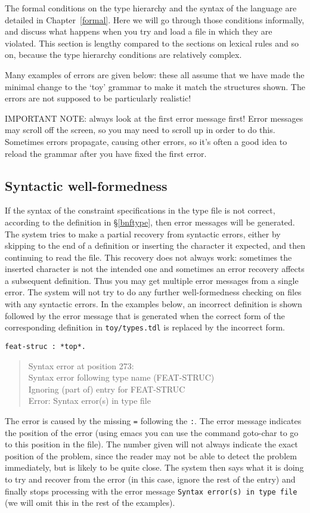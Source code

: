 \documentclass[12pt]{report}
\newenvironment{error}%
{\begin{quote}
\tt
}%
{\end{quote}
}
\begin{document}
The formal conditions on the type hierarchy and the syntax of the
language are
detailed in Chapter~\ref{formal}.
Here we will go through those conditions informally, and discuss what
happens when you try and load a file in which they are violated.
This section is lengthy compared to the sections
on lexical rules and so on, because the type hierarchy conditions
are relatively complex.

Many examples of errors 
are given below: these all assume that we have made the minimal
change to the `toy' grammar to make it match the structures shown.
The errors are not supposed to be particularly realistic!

IMPORTANT NOTE:  always look at the first error message first!
Error messages may scroll off the screen, so you may need to scroll up
in order to do this.  Sometimes errors propagate,
causing other errors, so it's often a good idea to reload the grammar
after you have fixed the first error.

\subsection{Syntactic well-formedness}
\label{synwf}
If the syntax of the constraint specifications in the type file is not 
correct, according to the definition in \S\ref{bnftype},
then error messages will be generated.  The system tries
to make a partial
recovery from syntactic errors, either by
skipping to the end of a definition or inserting the
character it expected,
and then continuing to read the file.
This recovery does not always work: sometimes the
inserted character is not the intended one and sometimes an
error recovery affects a subsequent definition.
Thus you may get multiple error messages from a single error.
The system will
not try to do any further well-formedness checking
on files with any syntactic errors.
In the examples below, an incorrect definition is shown
followed by the error message that is generated when the correct form of the
corresponding definition in {\tt toy/types.tdl} is replaced by 
the incorrect form.

\begin{verbatim}
feat-struc : *top*.
\end{verbatim}
\begin{error}
Syntax error at position 273: \\
Syntax error following type name (FEAT-STRUC)\\
Ignoring (part of) entry for FEAT-STRUC\\
Error: Syntax error(s) in type file
\end{error}
The error is caused by the missing {\tt =} following the
{\tt :}.  The error message indicates the position of
the error (using emacs you can use the command goto-char to
go to this position in the file).  The number given will
not always indicate the exact position of the problem, since the reader
may not be able to detect the problem immediately, but is likely to be quite close.  
The system then says what it is doing to try and recover from the error
(in this case, ignore the rest of the entry) and finally stops processing with
the error message {\tt Syntax error(s) in type file} (we will
omit this in the rest of the examples).
\end{document}
